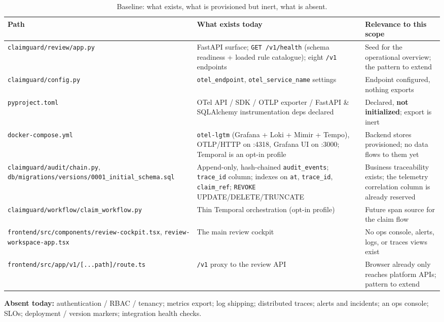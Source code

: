 \documentclass[11pt]{article}
\newcommand{\code}[1]{\texttt{#1}}
\begin{document}
\begin{table}[h]
\centering
\small
\begin{tabularx}{\textwidth}{@{} L L L @{}}
\toprule
\textbf{Path} & \textbf{What exists today} & \textbf{Relevance to this scope} \\
\midrule
\code{claimguard/review/app.py} & FastAPI surface; \code{GET /v1/health}
(schema readiness + loaded rule catalogue); eight \code{/v1} endpoints &
Seed for the operational overview; the pattern to extend \\
\code{claimguard/config.py} & \code{otel\_endpoint},
\code{otel\_service\_name} settings & Endpoint configured, nothing exports \\
\code{pyproject.toml} & OTel API / SDK / OTLP exporter / FastAPI \&
SQLAlchemy instrumentation deps declared & Declared, \textbf{not initialized};
export is inert \\
\code{docker-compose.yml} &
\code{otel-lgtm} (Grafana + Loki + Mimir + Tempo), OTLP/HTTP on :4318,
Grafana UI on :3000; Temporal is an opt-in profile &
Backend stores provisioned; no data flows to them yet \\
\code{claimguard/audit/chain.py},
\code{db/migrations/versions/0001\_initial\_schema.sql} &
Append-only, hash-chained \code{audit\_events}; \code{trace\_id} column;
indexes on \code{at}, \code{trace\_id}, \code{claim\_ref}; \code{REVOKE}
UPDATE/DELETE/TRUNCATE &
Business traceability exists; the telemetry correlation column is already
reserved \\
\code{claimguard/workflow/claim\_workflow.py} & Thin Temporal orchestration
(opt-in profile) & Future span source for the claim flow \\
\code{frontend/src/components/review-cockpit.tsx},
\code{review-workspace-app.tsx} & The main review cockpit & No ops console,
alerts, logs, or traces views exist \\
\code{frontend/src/app/v1/[...path]/route.ts} & \code{/v1} proxy to the
review API & Browser already only reaches platform APIs; pattern to extend \\
\bottomrule
\end{tabularx}
\caption{Baseline: what exists, what is provisioned but inert, what is absent.}
\label{tab:baseline}
\end{table}

\textbf{Absent today:} authentication / RBAC / tenancy; metrics export; log
shipping; distributed traces; alerts and incidents; an ops console; SLOs;
deployment / version markers; integration health checks.
\end{document}
